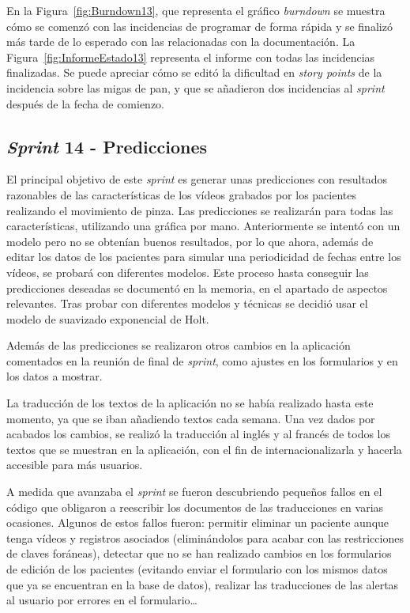 En la Figura~\ref{fig:Burndown13}, que representa el gráfico \textit{burndown} se muestra cómo se comenzó con las incidencias de programar de forma rápida y se finalizó más tarde de lo esperado con las relacionadas con la documentación.
La Figura~\ref{fig:InformeEstado13} representa el informe con todas las incidencias finalizadas. Se puede apreciar cómo se editó la dificultad en \textit{story points} de la incidencia sobre las migas de pan, y que se añadieron dos incidencias al \textit{sprint} después de la fecha de comienzo.



\subsection{\textit{Sprint} 14 - Predicciones}
El principal objetivo de este \textit{sprint} es generar unas predicciones con resultados razonables de las características de los vídeos grabados por los pacientes realizando el movimiento de pinza. Las predicciones se realizarán para todas las características, utilizando una gráfica por mano. Anteriormente se intentó con un modelo pero no se obtenían buenos resultados, por lo que ahora, además de editar los datos de los pacientes para simular una periodicidad de fechas entre los vídeos, se probará con diferentes modelos. Este proceso hasta conseguir las predicciones deseadas se documentó en la memoria, en el apartado de aspectos relevantes.
Tras probar con diferentes modelos y técnicas se decidió usar el modelo de suavizado exponencial de Holt.

Además de las predicciones se realizaron otros cambios en la aplicación comentados en la reunión de final de \textit{sprint}, como ajustes en los formularios y en los datos a mostrar.

La traducción de los textos de la aplicación no se había realizado hasta este momento, ya que se iban añadiendo textos cada semana. Una vez dados por acabados los cambios, se realizó la traducción al inglés y al francés de todos los textos que se muestran en la aplicación, con el fin de internacionalizarla y hacerla accesible para más usuarios.

A medida que avanzaba el \textit{sprint} se fueron descubriendo pequeños fallos en el código que obligaron a reescribir los documentos de las traducciones en varias ocasiones. Algunos de estos fallos fueron: permitir eliminar un paciente aunque tenga vídeos y registros asociados (eliminándolos para acabar con las restricciones de claves foráneas), detectar que no se han realizado cambios en los formularios de edición de los pacientes (evitando enviar el formulario con los mismos datos que ya se encuentran en la base de datos), realizar las traducciones de las alertas al usuario por errores en el formulario\ldots

